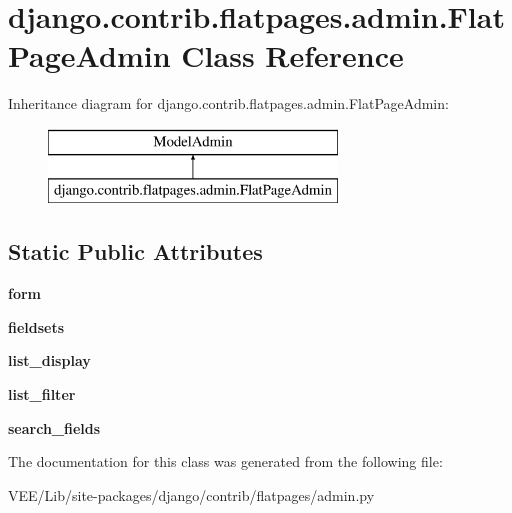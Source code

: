 \hypertarget{classdjango_1_1contrib_1_1flatpages_1_1admin_1_1_flat_page_admin}{}\section{django.\+contrib.\+flatpages.\+admin.\+Flat\+Page\+Admin Class Reference}
\label{classdjango_1_1contrib_1_1flatpages_1_1admin_1_1_flat_page_admin}
Inheritance diagram for django.\+contrib.\+flatpages.\+admin.\+Flat\+Page\+Admin\+:\begin{figure}[H]
\begin{center}
\leavevmode
\includegraphics[height=2.000000cm]{classdjango_1_1contrib_1_1flatpages_1_1admin_1_1_flat_page_admin}
\end{center}
\end{figure}
\subsection*{Static Public Attributes}
\begin{DoxyCompactItemize}
\item 
\mbox{\label{classdjango_1_1contrib_1_1flatpages_1_1admin_1_1_flat_page_admin_a9c4437a938308533c6b8f7253d53f1ab}} 
{\bfseries form}
\item 
\mbox{\label{classdjango_1_1contrib_1_1flatpages_1_1admin_1_1_flat_page_admin_a042cbd0b048de3905bb9c2f913759e0a}} 
{\bfseries fieldsets}
\item 
\mbox{\label{classdjango_1_1contrib_1_1flatpages_1_1admin_1_1_flat_page_admin_ab37fb6c8754933e73777794c652d91c0}} 
{\bfseries list\+\_\+display}
\item 
\mbox{\label{classdjango_1_1contrib_1_1flatpages_1_1admin_1_1_flat_page_admin_ae568d7e8f4e0ad3f31d73911211afd68}} 
{\bfseries list\+\_\+filter}
\item 
\mbox{\label{classdjango_1_1contrib_1_1flatpages_1_1admin_1_1_flat_page_admin_a138951636953bbd1a75e885056ca1dd4}} 
{\bfseries search\+\_\+fields}
\end{DoxyCompactItemize}


The documentation for this class was generated from the following file\+:\begin{DoxyCompactItemize}
\item 
V\+E\+E/\+Lib/site-\/packages/django/contrib/flatpages/admin.\+py\end{DoxyCompactItemize}
